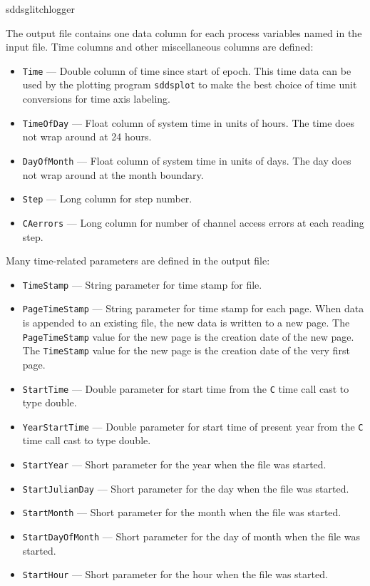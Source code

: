 \begin{sddsprog}{sddsglitchlogger}
\begin{itemize}
The output file contains one data column for each process variables named in the input file.
Time columns and other miscellaneous columns are defined:
  \begin{itemize}
    \item {\tt Time} --- Double column of time since start of epoch. This time data can be used by
        the plotting program {\verb+sddsplot+} to make the best choice of time unit conversions
        for time axis labeling.
    \item {\tt TimeOfDay} --- Float column of system time in units of hours.
        The time does not wrap around at 24 hours.
    \item {\tt DayOfMonth} --- Float column of system time in units of days.
        The day does not wrap around at the month boundary.
    \item {\tt Step} --- Long column for step number.
    \item {\tt CAerrors} --- Long column for number of channel access errors at each reading step.
  \end{itemize}

Many time-related parameters are defined in the output file:
  \begin{itemize}
    \item {\tt TimeStamp} --- String parameter for time stamp for file.
    \item {\tt PageTimeStamp} --- String parameter for time stamp for each page. When data
                is appended to an existing file, the new data is written to a new
                page. The {\tt PageTimeStamp} value for the new page is the creation
                date of the new page. The {\tt TimeStamp} value for the new page is the creation
                date of the very first page.
    \item {\tt StartTime} --- Double parameter for start time from the {\tt C} time call cast to type double.
    \item {\tt YearStartTime} --- Double parameter for start time of present year from the {\tt C} time call cast to type double.
    \item {\verb+StartYear+} --- Short parameter for the year when the file was started.
    \item {\verb+StartJulianDay+} --- Short parameter for the day when the file was started.
    \item {\verb+StartMonth+} --- Short parameter for the month when the file was started.
    \item {\verb+StartDayOfMonth+} --- Short parameter for the day of month when the file was started.
    \item {\verb+StartHour+} --- Short parameter for the hour when the file was started.
  \end{itemize}
\end{itemize}


\end{sddsprog}

